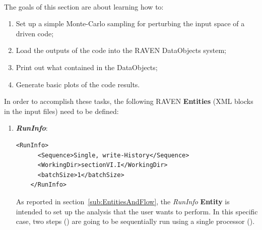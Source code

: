  \\ The goals of this section are about learning how to:
 \begin{enumerate}
   \item Set up a simple Monte-Carlo sampling for perturbing the input space of a driven code;
   \item Load the outputs of the code into the RAVEN DataObjects system;
   \item Print out what contained in the DataObjects;
   \item Generate basic plots of the code results.
\end{enumerate}  
In order to accomplish these tasks, the following RAVEN \textbf{Entities} (XML blocks in the input files) need to be defined:
 \begin{enumerate}
   \item \textbf{\textit{RunInfo}}:
\begin{lstlisting}[style=XML,morekeywords={arg,extension,pauseAtEnd,overwrite}]
    <RunInfo>
      <Sequence>Single, write-History</Sequence>
      <WorkingDir>sectionVI.I</WorkingDir>
      <batchSize>1</batchSize>
    </RunInfo>   
\end{lstlisting}   
   As reported in section~\ref{sub:EntitiesAndFlow}, the \textit{RunInfo} \textbf{Entity} is intended to set up the analysis 
   that the user wants to perform. In this specific case, two steps () are going to be sequentially run 
   using a single processor ().
   

\end{enumerate}
